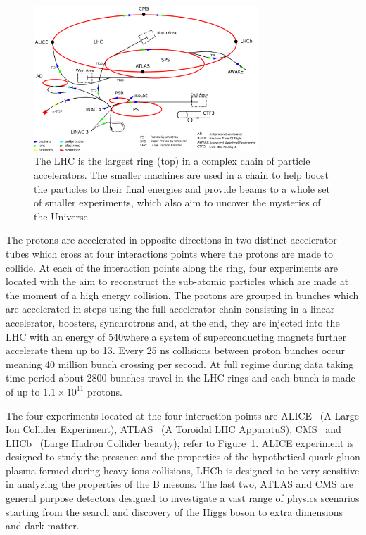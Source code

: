 \begin{figure}[h]
\centering
\includegraphics[width=0.75\textwidth]{Figures/c2/Cern-accelerator-complex.png}
\vspace*{3mm}
\caption{The LHC is the largest ring (top) in a complex chain of particle accelerators. The smaller machines are used in a chain to help boost the particles to their final energies and provide beams to a whole set of smaller experiments, which also aim to uncover the mysteries of the Universe~\cite{Mobs:2197559}}
\label{fig:cern}
\end{figure}

The protons are accelerated in opposite directions in two distinct
accelerator tubes which cross at four interactions points where the
protons are made to collide. At each of the interaction points along the ring,
four experiments are located with the aim to reconstruct the
sub-atomic particles which are made at the moment of a high energy
collision. The protons are grouped in bunches which are
accelerated in steps using the full accelerator chain consisting in a linear
accelerator, boosters, synchrotrons and, at the end, they are injected
into the LHC with an energy of 540\GeV where a system of
superconducting magnets further accelerate them up to 13\TeV. Every
25 ns collisions between proton bunches occur meaning 40 million
bunch crossing per second. At full regime during data taking time
period about 2800 bunches travel in the LHC rings and each bunch is
made of up to $1.1\times10^{11}$ protons.

The four experiments located at the four interaction points are
ALICE~\cite{alice_2008} (A Large Ion Collider Experiment),
ATLAS~\cite{atlas_2008} (A Toroidal LHC ApparatuS),
CMS~\cite{cms_2008} and LHCb~\cite{lhcb_2008} (Large Hadron Collider
beauty), refer to Figure~\ref{fig:cern}. ALICE experiment is designed
to study the presence and the properties of the hypothetical
quark-gluon plasma formed during heavy ions collisions, LHCb is
designed to be very sensitive in analyzing the properties of the B
mesons. The last two, ATLAS and CMS are general purpose detectors
designed to investigate a vast range of physics scenarios starting
from the search and discovery of the Higgs boson to extra dimensions
and dark matter. \\

